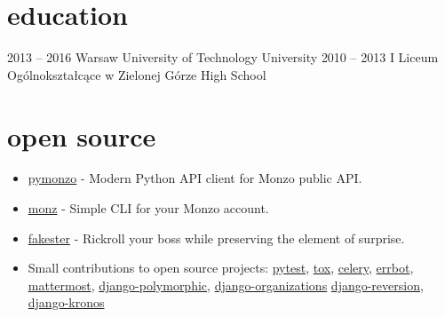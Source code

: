 \documentclass[]{cv-style}          %
\begin{document}
\vspace{-0.3cm}


\section{education}
  \vspace{-0.3cm}

\begin{entrylist}
\entry
  {2013 -- 2016}
  {Warsaw University of Technology}
  {University}
  {}
\entry
  {2010 -- 2013}
  {I Liceum Ogólnokształcące w Zielonej Górze}
  {High School}
  {}
\end{entrylist}

\vspace{-0.5cm}


\section{open source}
  \vspace{-0.3cm}

\begin{itemize}
  \item \href{https://github.com/pawelad/pymonzo}{pymonzo} - Modern Python API client for Monzo public API.
  \item \href{https://github.com/pawelad/monz}{monz} - Simple CLI for your Monzo account.
  \item \href{https://github.com/pawelad/fakester}{fakester} - Rickroll your boss while preserving the element of surprise.
  \item Small contributions to open source projects: \href{https://github.com/pytest-dev/pytest}{pytest}, \href{https://github.com/tox-dev/tox}{tox}, \href{https://github.com/celery/celery}{celery}, \href{https://github.com/errbotio/errbot}{errbot}, \href{https://github.com/mattermost/mattermost}{mattermost}, \href{https://github.com/jazzband/django-polymorphic}{django-polymorphic}, \href{https://github.com/bennylope/django-organizations}{django-organizations} \href{https://github.com/etianen/django-reversion}{django-reversion}, \href{https://github.com/jgorset/django-kronos}{django-kronos}
\end{itemize}
\end{document}
